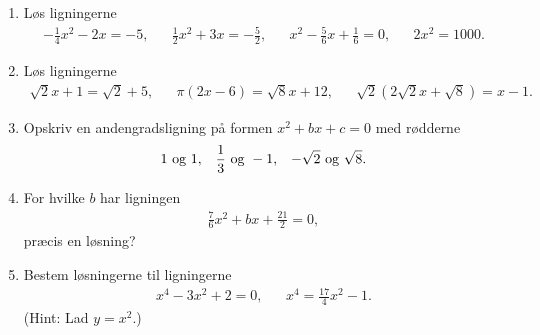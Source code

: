 \begin{enumerate}
\item Løs ligningerne
\begin{align*}
-\frac{1}{4}x^2-2x=-5,&& \frac{1}{2}x^2+3x=-\frac{5}{2},&& x^2-\frac{5}{6}x+\frac{1}{6}=0,&& 2x^2=1000.
\end{align*}



\item Løs ligningerne
\begin{align*}
\sqrt{2}x+1=\sqrt{2}+5,&& \pi(2x-6)=\sqrt{8}x+12,&& \sqrt{2}(2\sqrt{2}x+\sqrt{8})=x-1.
\end{align*}

	\item 	Opskriv en andengradsligning på formen $x^2+bx+c=0$ med rødderne
	\begin{align*}
	1 \textup{ og } 1,&& \frac{1}{3} \textup{ og } -1,&&  -\sqrt{2} \textup{ og } \sqrt{8}.
	\end{align*}
	
	
	\item For hvilke $b$ har ligningen
	\begin{align*}
	\frac{7}{6}x^2+bx+\frac{21}{2}=0,
	\end{align*}
	præcis en løsning?
	
	
	\item Bestem løsningerne til ligningerne
	\begin{align*}
	x^4-3x^2+2=0,&& x^4=\frac{17}{4}x^2-1.
	\end{align*}
	(Hint: Lad $y=x^2$.)
	

	
\end{enumerate}